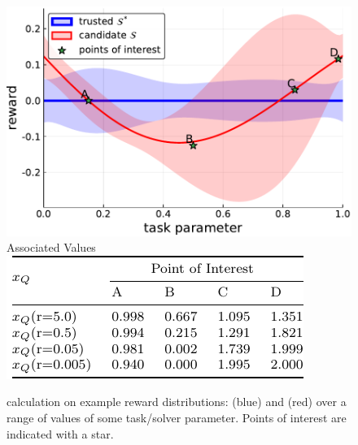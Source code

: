 \begin{figure}[tbp]
    \centering
    \includegraphics[width=0.9\linewidth]{Figures/p1}\\
    \vspace{0.2cm}
    Associated \xQ{} Values\\
    \vspace{0.1cm}
    \includegraphics[width=0.6\linewidth]{Figures/p1_table}\\
    \caption{\xQ{} calculation on example reward distributions: \solvestar{} (blue) and \solve{} (red) over a range of values of some task/solver parameter. Points of interest are indicated with a star.}
    \label{fig:sq_thry1}
\end{figure}
